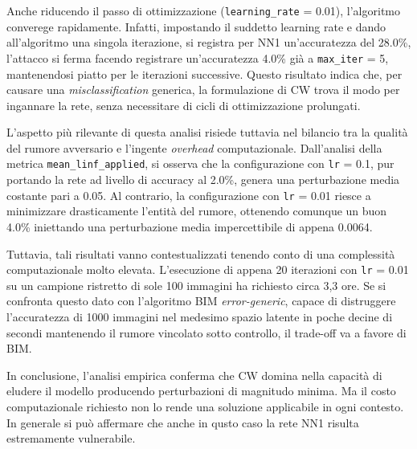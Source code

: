 \documentclass[a4paper, 12pt]{article}
\begin{document}
Anche riducendo il passo di ottimizzazione (\texttt{learning\_rate} = 0.01), l'algoritmo converege rapidamente. Infatti, impostando il suddetto learning rate e dando all'algoritmo una singola iterazione, si registra per NN1 un'accuratezza del 28.0\%, l'attacco si ferma facendo registrare un'accuratezza 4.0\% già a \texttt{max\_iter} = 5, mantenendosi piatto per le iterazioni successive. Questo risultato indica che, per causare una \textit{misclassification} generica, la formulazione di CW trova il modo per ingannare la rete, senza necessitare di cicli di ottimizzazione prolungati.

L'aspetto più rilevante di questa analisi risiede tuttavia nel bilancio tra la qualità del rumore avversario e l'ingente \textit{overhead} computazionale. Dall'analisi della metrica \texttt{mean\_linf\_applied}, si osserva che la configurazione con \texttt{lr} = 0.1, pur portando la rete ad livello di accuracy al 2.0\%, genera una perturbazione media costante pari a 0.05. Al contrario, la configurazione con \texttt{lr} = 0.01 riesce a minimizzare drasticamente l'entità del rumore, ottenendo comunque un buon 4.0\% iniettando una perturbazione media impercettibile di appena 0.0064.

Tuttavia, tali risultati vanno contestualizzati tenendo conto di una complessità computazionale molto elevata. L'esecuzione di appena 20 iterazioni con \texttt{lr} = 0.01 su un campione ristretto di sole 100 immagini ha richiesto circa 3,3 ore. Se si confronta questo dato con l'algoritmo BIM \textit{error-generic}, capace di distruggere l'accuratezza di 1000 immagini nel medesimo spazio latente in poche decine di secondi mantenendo il rumore vincolato sotto controllo, il trade-off va a favore di BIM. 

In conclusione, l'analisi empirica conferma che CW domina nella capacità di eludere il modello producendo perturbazioni di magnitudo minima. Ma il costo computazionale richiesto non lo rende una soluzione applicabile in ogni contesto. In generale si può affermare che anche in qusto caso la rete NN1 risulta estremamente vulnerabile.
\end{document}

